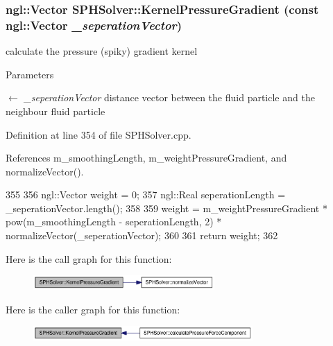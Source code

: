\hypertarget{class_s_p_h_solver_a5086e88784204568d4cf4e227309025f}{
\subsubsection[{KernelPressureGradient}]{\setlength{\rightskip}{0pt plus 5cm}ngl::Vector SPHSolver::KernelPressureGradient (const ngl::Vector {\em \_\-seperationVector})}}
\label{class_s_p_h_solver_a5086e88784204568d4cf4e227309025f}


calculate the pressure (spiky) gradient kernel 


\begin{DoxyParams}{Parameters}
\item[\mbox{$\leftarrow$} {\em \_\-seperationVector}]distance vector between the fluid particle and the neighbour fluid particle \end{DoxyParams}


Definition at line 354 of file SPHSolver.cpp.



References m\_\-smoothingLength, m\_\-weightPressureGradient, and normalizeVector().




\begin{DoxyCode}
355 {
356     ngl::Vector weight = 0;
357     ngl::Real seperationLength = _seperationVector.length();
358 
359     weight = m_weightPressureGradient * pow(m_smoothingLength - seperationLength,
       2) * normalizeVector(_seperationVector);
360 
361     return weight;
362 }
\end{DoxyCode}




Here is the call graph for this function:\nopagebreak
\begin{figure}[H]
\begin{center}
\leavevmode
\includegraphics[width=196pt]{class_s_p_h_solver_a5086e88784204568d4cf4e227309025f_cgraph}
\end{center}
\end{figure}




Here is the caller graph for this function:\nopagebreak
\begin{figure}[H]
\begin{center}
\leavevmode
\includegraphics[width=237pt]{class_s_p_h_solver_a5086e88784204568d4cf4e227309025f_icgraph}
\end{center}
\end{figure}


